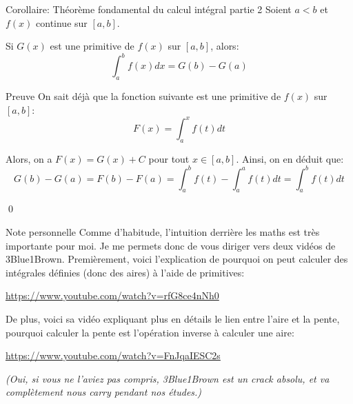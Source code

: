 \documentclass[a4paper]{article}
\begin{document}
\begin{parag}{Corollaire: Théorème fondamental du calcul intégral partie 2}
    Soient $a < b$ et $f\left(x\right)$ continue sur $\left[a,b\right]$.

    Si $G\left(x\right)$ est une primitive de $f\left(x\right)$ sur $\left[a, b\right]$, alors: 
    \[\int_{a}^{b} f\left(x\right) dx = G\left(b\right) - G\left(a\right)\]
    
    \begin{subparag}{Preuve}
        On sait déjà que la fonction suivante est une primitive de $f\left(x\right)$ sur $\left[a, b\right]$: 
        \[F\left(x\right) = \int_{a}^{x} f\left(t\right)dt\]
        
        Alors, on a $F\left(x\right) = G\left(x\right) + C$ pour tout $x \in \left[a, b\right] $. Ainsi, on en déduit que: 
        \[G\left(b\right) - G\left(a\right) = F\left(b\right) - F\left(a\right) = \int_{a}^{b} f\left(t\right) - \int_{a}^{a} f\left(t\right)dt = \int_{a}^{b} f\left(t\right)dt\]

        \qed
    \end{subparag}

    \begin{subparag}{Note personnelle}
        Comme d'habitude, l'intuition derrière les maths est très importante pour moi. Je me permets donc de vous diriger vers deux vidéos de 3Blue1Brown. Premièrement, voici l'explication de pourquoi on peut calculer des intégrales définies (donc des aires) à l'aide de primitives:
        \begin{center}
            \url{https://www.youtube.com/watch?v=rfG8ce4nNh0}
        \end{center}

        De plus, voici sa vidéo expliquant plus en détails le lien entre l'aire et la pente, pourquoi calculer la pente est l'opération inverse à calculer une aire:
        \begin{center}
            \url{https://www.youtube.com/watch?v=FnJqaIESC2s}
        \end{center}

        \textit{(Oui, si vous ne l'aviez pas compris, 3Blue1Brown est un crack absolu, et va complètement nous carry pendant nos études.)}
    \end{subparag}
    
\end{parag}
\end{document}
